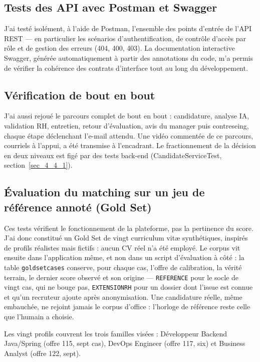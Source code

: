 \documentclass[]{./tpl/isipfe}
\def\_{\textunderscore\allowbreak}
\begin{document}
\subsection{Tests des API avec Postman et Swagger}
\label{sec_4_4_3}
J’ai testé isolément, à l’aide de Postman, l’ensemble des points d’entrée de l’API REST — en particulier les scénarios d’authentification, de contrôle d’accès par rôle et de gestion des erreurs (404, 400, 403). La documentation interactive Swagger, générée automatiquement à partir des annotations du code, m’a permis de vérifier la cohérence des contrats d’interface tout au long du développement.

\subsection{Vérification de bout en bout}
\label{sec_4_4_4}
J’ai aussi rejoué le parcours complet de bout en bout : candidature, analyse IA, validation RH, entretien, retour d’évaluation, avis du manager puis contreseing, chaque étape déclenchant l’e-mail attendu. Une vidéo commentée de ce parcours, courriels à l’appui, a été transmise à l’encadrant. Le fractionnement de la décision en deux niveaux est figé par des tests back-end (Candidate\allowbreak{}Service\allowbreak{}Test, section~\ref{sec_4_4_1}).

\subsection{Évaluation du matching sur un jeu de référence annoté (Gold Set)}
\label{sec_4_4_5}
Ces tests vérifient le fonctionnement de la plateforme, pas la pertinence du score. J’ai donc constitué un Gold Set \cite{ref21} de vingt curriculum vitæ synthétiques, inspirés de profils réalistes mais fictifs : aucun CV réel n’a été employé. Le corpus vit ensuite dans l’application même, et non dans un script d’évaluation à côté : la table \texttt{gold\_set\_cases} conserve, pour chaque cas, l’offre de calibration, la vérité terrain, le dernier score observé et son origine — \texttt{REFERENCE} pour le socle de vingt cas, qui ne bouge pas, \texttt{EXTENSION\_RH} pour un dossier dont l’issue est connue et qu’un recruteur ajoute après anonymisation. Une candidature réelle, même embauchée, ne rejoint jamais le corpus d’office : l’horloge de référence reste celle que l’humain a choisie.

Les vingt profils couvrent les trois familles visées : Développeur Backend Java/Spring (offre 115, sept cas), DevOps Engineer (offre 117, six) et Business Analyst (offre 122, sept).
\end{document}
